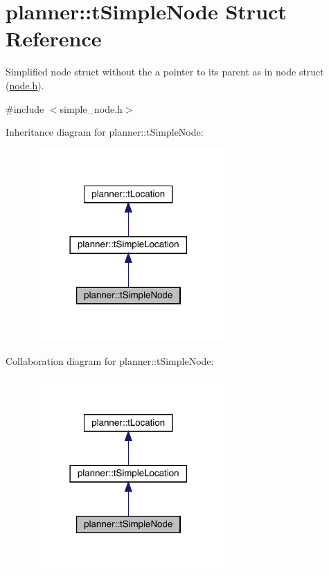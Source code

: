 \hypertarget{structplanner_1_1t_simple_node}{}\section{planner\+:\+:t\+Simple\+Node Struct Reference}
\label{structplanner_1_1t_simple_node}


Simplified node struct without the a pointer to its parent as in node struct (\mbox{\hyperlink{node_8h_source}{node.\+h}}).  




{\ttfamily \#include $<$simple\+\_\+node.\+h$>$}



Inheritance diagram for planner\+:\+:t\+Simple\+Node\+:\nopagebreak
\begin{figure}[H]
\begin{center}
\leavevmode
\includegraphics[width=206pt]{structplanner_1_1t_simple_node__inherit__graph}
\end{center}
\end{figure}


Collaboration diagram for planner\+:\+:t\+Simple\+Node\+:\nopagebreak
\begin{figure}[H]
\begin{center}
\leavevmode
\includegraphics[width=206pt]{structplanner_1_1t_simple_node__coll__graph}
\end{center}
\end{figure}
